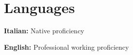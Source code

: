 \section{Languages}

\begin{onecolentry}
    \textbf{Italian:} Native proficiency
\end{onecolentry}

\vspace{0.2 cm} %

\begin{onecolentry}
    \textbf{English:} Professional working proficiency
\end{onecolentry}
